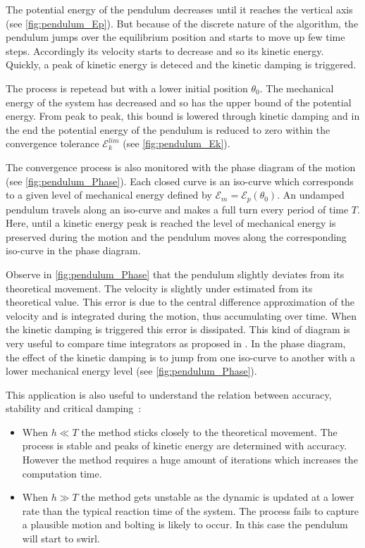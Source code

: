 The potential energy of the pendulum decreases until it reaches the vertical axis (see \cref{fig:pendulum_Ep}). But because of the discrete nature of the algorithm, the pendulum jumps over the equilibrium position and starts to move up few time steps. Accordingly its velocity starts to decrease and so its kinetic energy. Quickly, a peak of kinetic energy is deteced and the kinetic damping is triggered.

The process is repetead but with a lower initial position $\theta_0$. The mechanical energy of the system has decreased and so has the upper bound of the potential energy. From peak to peak, this bound is lowered through kinetic damping and in the end the potential energy of the pendulum is reduced to zero within the convergence tolerance $\mathcal{E}_k^{lim}$ (see \cref{fig:pendulum_Ek}).

The convergence process is also monitored with the phase diagram of the motion (see \cref{fig:pendulum_Phase}). Each closed curve is an iso-curve which corresponds to a given level of mechanical energy defined by $\mathcal{E}_m = \mathcal{E}_p(\theta_0)$. An undamped pendulum travels along an iso-curve and makes a full turn every period of time $T$. Here, until a kinetic energy peak is reached the level of mechanical energy is preserved during the motion and the pendulum moves along the corresponding iso-curve in the phase diagram.

Observe in \cref{fig:pendulum_Phase} that the pendulum slightly deviates from its theoretical movement. The velocity is slightly under estimated from its theoretical value. This error is due to the central difference approximation of the velocity and is integrated during the motion, thus accumulating over time. When the kinetic damping is triggered this error is dissipated. This kind of diagram is very useful to compare time integrators as proposed in \cite{Hairer2006}. In the phase diagram, the effect of the kinetic damping is to jump from one iso-curve to another with a lower mechanical energy level (see \cref{fig:pendulum_Phase}).

This application is also useful to understand the relation between accuracy, stability and critical damping~:
\begin{itemize}
\item When $h \ll T$ the method sticks closely to the theoretical movement. The process is stable and peaks of kinetic energy are determined with accuracy. However the method requires a huge amount of iterations which increases the computation time.
\item When $h \gg T$ the method gets unstable as the dynamic is updated at a lower rate than the typical reaction time of the system. The process fails to capture a plausible motion and bolting is likely to occur. In this case the pendulum will start to swirl.
\end{itemize}

